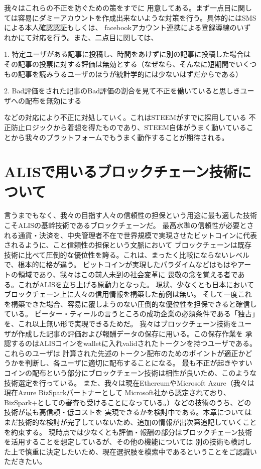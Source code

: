 \documentclass{jsarticle}
\begin{document}
我々はこれらの不正を防ぐための策をすでに
用意してある。まず一点目に関しては容易にダミーアカウントを作成出来ないような対策を行う。具体的にはSMSによる本人確認認証もしくは、
facebookアカウント連携による登録導線のいずれかにて対応を行う。また、二点目に関しては、

1. 特定ユーザがある記事に投稿し、時間をあけずに別の記事に投稿した場合はその記事の投票に対する評価は無効とする（なぜなら、そんなに短期間でいくつもの記事を読みうるユーザのほうが統計学的には少ないはずだからである）

2. Bad評価をされた記事のBad評価の割合を見て不正を働いていると思しきユーザへの配布を無効にする

などの対応により不正に対処していく。これはSTEEMがすでに採用している
不正防止ロジックから着想を得たものであり、STEEM自体がうまく動いていることから我々のプラットフォームでもうまく動作することが期待される。
\section{ALISで用いるブロックチェーン技術について}
言うまでもなく、我々の目指す人々の信頼性の担保という用途に最も適した技術こそALISの基幹技術であるブロックチェーンだ。
最高水準の信頼性が必要とされる通貨・決済を、中央管理者不在で世界規模で実現させたビットコインに代表されるように、こと信頼性の担保という文脈において
ブロックチェーンは既存技術に比べて圧倒的な優位性を誇る。これは、まったく比較にならないレベルで、根本的に格が違う。
ビットコインが実現したパラダイムなどはもはやアートの領域であり、我々はこの前人未到の社会変革に
畏敬の念を覚える者である。これがALISを立ち上げる原動力となった。
現状、少なくとも日本においてブロックチェーン上に人々の信用情報を構築した前例は無い。
そして一度これを構築できた場合、容易に覆しようのない圧倒的な優位性を担保できると確信している。
ピーター・ティールの言うところの成功企業の必須条件である「独占」を、これ以上無い形で実現できるためだ。
我々はブロックチェーン技術をユーザが作成した記事の評価および報酬データの保存に用いる。この保存作業を
承認するのはALISコインをwalletに入れvalidされたトークンを持つユーザである。これらのユーザは
計算された先述のトークン配布のためのポイントが適正かどうかを判断し、各ユーザに適切に配布することになる。
最も不正が起きやすいコインの配布という部分にブロックチェーン技術は相性が良いため、このような技術選定を行っている。
また、我々は現在EthereumやMicrosoft Azure（我々は現在Azure BizSparkパートナーとして
Microsoft社から認定されており、BizSpark+としての審査も受けることになっている。）などの技術のうち、どの技術が最も高信頼・低コストを
実現できるかを検討中である。本章についてはまだ技術的な検討が完了していないため、追加の情報が出次第追記していくことを約束する。
現時点では少なくとも評価・報酬の部分はブロックチェーン技術を活用することを想定しているが、その他の機能については
別の技術も検討した上で慎重に決定したいため、現在選択肢を模索中であるということをご認識いただきたい。
\end{document}

